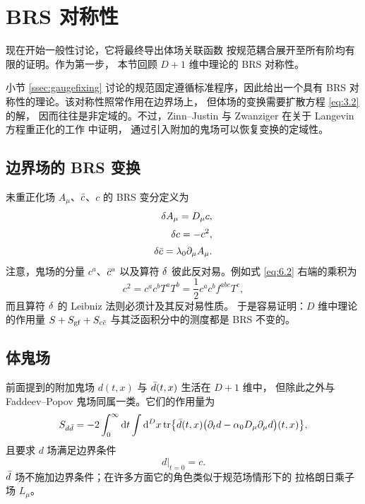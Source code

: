\section{BRS 对称性}\label{sec:brs}

现在开始一般性讨论，它将最终导出体场关联函数
按规范耦合展开至所有阶均有限的证明。作为第一步，
本节回顾 $D+1$ 维中理论的 BRS 对称性。

小节 \ref{ssec:gaugefixing} 讨论的规范固定遵循标准程序，因此给出一个具有
BRS 对称性的理论。该对称性照常作用在边界场上，
但体场的变换需要扩散方程 \eqref{eq:3.2} 的解，
因而往往是非定域的。不过，Zinn--Justin 与 Zwanziger 在关于
Langevin 方程重正化的工作 \cite{ZinnZwanziger} 中证明，
通过引入附加的鬼场可以恢复变换的定域性。

\subsection{边界场的 BRS 变换}

未重正化场 $A_{\mu}$、$\bar{c}$、$c$ 的 BRS 变分定义为 \cite{BRSI,BRSII}
\begin{align}
   \delta A_{\mu}=D_{\mu}c,
   \label{eq:6.1}\\[2pt]
   \delta c=-c^2,
   \label{eq:6.2}\\[2pt]
   \delta\bar{c}=\lambda_0\partial_{\mu}A_{\mu}.
   \label{eq:6.3}
\end{align}
注意，鬼场的分量 $c^a$、$\bar{c}^a$ 以及算符 $\delta$
彼此反对易。例如式 \eqref{eq:6.2} 右端的乘积为
\begin{equation}
   c^2=c^ac^bT^aT^b=\frac{1}{2}c^ac^bf^{abc}T^c,
   \label{eq:6.4}
\end{equation}
而且算符 $\delta$ 的 Leibniz 法则必须计及其反对易性质。
于是容易证明：$D$ 维中理论的作用量 $S+S_{\mathrm{gf}}+S_{c\bar{c}}$
与其泛函积分中的测度都是 BRS 不变的。

\subsection{体鬼场}

前面提到的附加鬼场 $d(t,x)$ 与 $\bar{d}(t,x)$ 生活在 $D+1$ 维中，
但除此之外与 Faddeev--Popov 鬼场同属一类。它们的作用量为
\begin{equation}
   S_{d\bar{d}}=-2\int_{0}^{\infty}\mathrm{d} t\int\mathrm{d}^Dx\,
   \mathrm{tr}\bigl\{
   \bar{d}(t,x)\bigl(\partial_td-\alpha_0 D_{\mu}\partial_{\mu}d\bigr)(t,x)
   \bigr\},
   \label{eq:6.5}
\end{equation}
且要求 $d$ 场满足边界条件
\begin{equation}
   \left.d\right|_{t=0}=c.
   \label{eq:6.6}
\end{equation}
$\bar{d}$ 场不施加边界条件；在许多方面它的角色类似于规范场情形下的
拉格朗日乘子场 $L_{\mu}$。

